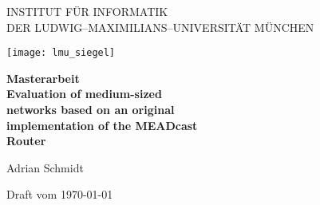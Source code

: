 
\thispagestyle{empty}

\begin{center}

\vspace*{-2cm}

{\Huge INSTITUT FÜR INFORMATIK\\[1mm]}
DER LUDWIG--MAXIMILIANS--UNIVERSITÄT MÜNCHEN\\

\vspace*{1cm}

\texttt{[image: lmu\_siegel]}

\vspace*{2cm}

{\Large \textbf{Masterarbeit}}\\ %

\vspace{2.0cm}
{\Huge \textbf{Evaluation of medium-sized}}\\
\vspace*{3mm}
{\Huge \textbf{networks based on an original}}\\
\vspace*{3mm}
{\Huge \textbf{implementation of the MEADcast}}\\
\vspace*{3mm}
{\Huge \textbf{Router}}\\
\vspace{1.5cm}

{\LARGE Adrian Schmidt} %

\vspace{3cm}
Draft vom \today %

\end{center}

\newpage


\thispagestyle{empty}
\cleardoublepage

